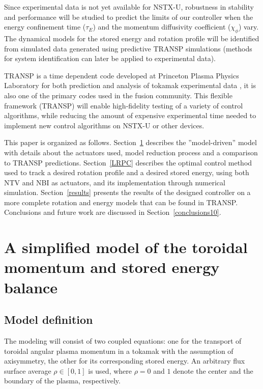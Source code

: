 \documentclass[12pt,lot, lof]{puthesis}
\begin{document}
Since experimental data is not yet available for NSTX-U, robustness in stability and performance will be studied to predict the limits of our controller when the energy confinement time ($\tau_E$) and the momentum diffusivity coefficient ($\chi_{\phi}$) vary.
The dynamical models for the stored energy and rotation profile will be identified from simulated data generated using predictive TRANSP simulations (methods for system identification can later be applied to experimental data). 

TRANSP is a time dependent code developed at Princeton Plasma Physics Laboratory for both prediction and analysis of tokamak experimental data \cite{Budny94, Goldston81}, it is also one of the primary codes used in the fusion community.
This flexible framework (TRANSP) will enable high-fidelity testing of a variety of control algorithms, while reducing the amount of expensive experimental time needed to implement new control algorithms on NSTX-U or other devices.

This paper is organized as follows.  Section~\ref{MHW} describes the ''model-driven'' model with details about the actuators used, model reduction process and a comparison to TRANSP predictions. Section~\ref{LRPC} describes the optimal control method used to track a desired rotation profile and a desired stored energy, using both NTV and NBI as actuators, and its implementation through numerical simulation. Section~\ref{results} presents the results of the designed controller on a more complete rotation and energy models that can be found in TRANSP. Conclusions and future work are discussed in Section~\ref{conclusions10}.

 \section{A simplified model of  the toroidal momentum and stored energy balance }
 \label{MHW}
 
 \subsection{Model definition}
The modeling will consist of two coupled equations: one for the transport of toroidal angular plasma momentum in a tokamak with the assumption of axisymmetry, the other for its corresponding stored energy.
An arbitrary flux surface average $\rho \in [0,1]$ is used, where $\rho = 0$ and $1$ denote the center and the boundary of the plasma, respectively.  
 
\end{document}
